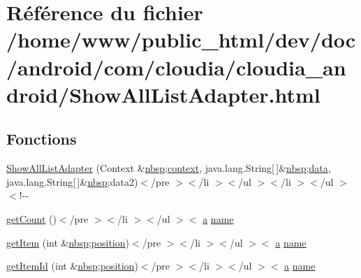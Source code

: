 \hypertarget{_show_all_list_adapter_8html}{\section{Référence du fichier /home/www/public\-\_\-html/dev/doc/android/com/cloudia/cloudia\-\_\-android/\-Show\-All\-List\-Adapter.html}
\label{_show_all_list_adapter_8html}
}
\subsection*{Fonctions}
\begin{DoxyCompactItemize}
\item 
\hyperlink{_show_all_list_adapter_8html_a05b4d265c71120d6a94a0a01d4766841}{Show\-All\-List\-Adapter} (Context \&\hyperlink{_tools_8html_aef915316f784c9063d942974538301a6}{nbsp};\hyperlink{_stations_list_adapter_8html_a261f9f58ccbeaa962c4e675e4212c9cc}{context}, java.\-lang.\-String\mbox{[}$\,$\mbox{]}\&\hyperlink{_tools_8html_aef915316f784c9063d942974538301a6}{nbsp};\hyperlink{_show_all_list_adapter_8html_a511ae0b1c13f95e5f08f1a0dd3da3d93}{data}, java.\-lang.\-String\mbox{[}$\,$\mbox{]}\&\hyperlink{_tools_8html_aef915316f784c9063d942974538301a6}{nbsp};data2)$<$/pre $>$$<$/li $>$$<$/ul $>$$<$/li $>$$<$/ul $>$$<$!-\/-\/
\item 
\hyperlink{_show_all_list_adapter_8html_a191788ed350b4e78a3d5dbbecc391f4b}{get\-Count} ()$<$/pre $>$$<$/li $>$$<$/ul $>$$<$ \hyperlink{style_8css_a5e8981582017bb8b84c21f148345d1f7}{a} \hyperlink{_cloudia_d_b_8html_ab74e6bf80237ddc4109968cedc58c151}{name}
\item 
\hyperlink{_show_all_list_adapter_8html_acf501ac8c326886f176c7537b25b50c2}{get\-Item} (int \&\hyperlink{_tools_8html_aef915316f784c9063d942974538301a6}{nbsp};\hyperlink{_stations_list_adapter_8html_a7130b1618285588513fd1ff97884b9d9}{position})$<$/pre $>$$<$/li $>$$<$/ul $>$$<$ \hyperlink{style_8css_a5e8981582017bb8b84c21f148345d1f7}{a} \hyperlink{_cloudia_d_b_8html_ab74e6bf80237ddc4109968cedc58c151}{name}
\item 
\hyperlink{_show_all_list_adapter_8html_a1876229af249fce570935e1884049444}{get\-Item\-Id} (int \&\hyperlink{_tools_8html_aef915316f784c9063d942974538301a6}{nbsp};\hyperlink{_stations_list_adapter_8html_a7130b1618285588513fd1ff97884b9d9}{position})$<$/pre $>$$<$/li $>$$<$/ul $>$$<$ \hyperlink{style_8css_a5e8981582017bb8b84c21f148345d1f7}{a} \hyperlink{_cloudia_d_b_8html_ab74e6bf80237ddc4109968cedc58c151}{name}

\end{DoxyCompactItemize}
